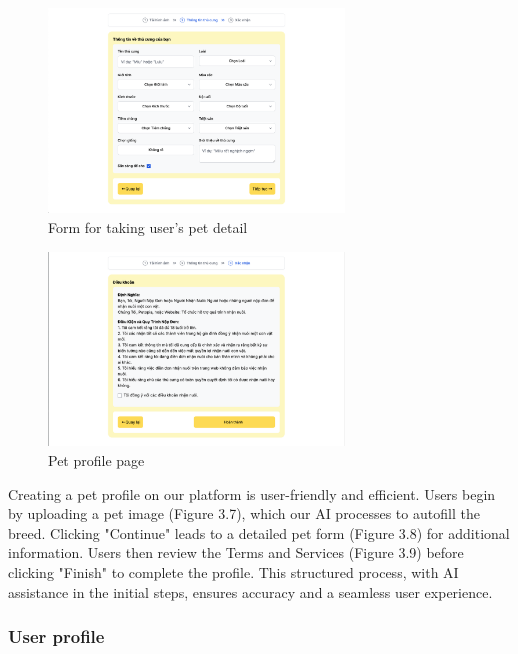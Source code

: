 \begin{figure}[H]
    \centering
    \includegraphics[width=0.7\textwidth]{Figures/UI/pet_input_ui.png}
    \caption{Form for taking user's pet detail}
\end{figure}

\begin {figure}[H]
\centering
\includegraphics[width=0.7\textwidth]{Figures/UI/term_ui.png}
\caption{Pet profile page}
\end{figure}

Creating a pet profile on our platform is user-friendly and efficient. Users begin by uploading a pet image (Figure 3.7), which our AI processes to autofill the breed. Clicking "Continue" leads to a detailed pet form (Figure 3.8) for additional information. Users then review the Terms and Services (Figure 3.9) before clicking "Finish" to complete the profile. This structured process, with AI assistance in the initial steps, ensures accuracy and a seamless user experience.

\subsubsection{User profile}


